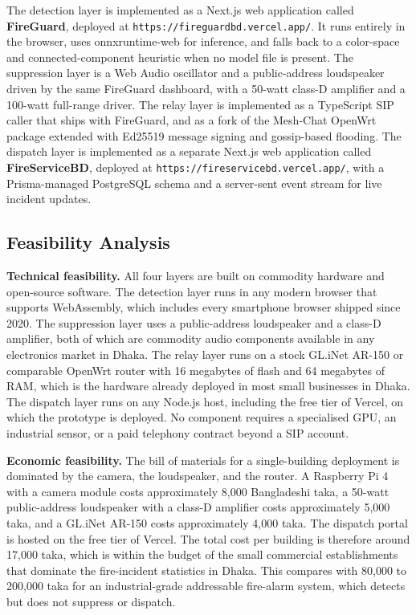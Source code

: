 The detection layer is implemented as a Next.js web application called \textbf{FireGuard}, deployed at \texttt{https://fireguardbd.vercel.app/}. It runs entirely in the browser, uses onnxruntime-web for inference, and falls back to a color-space and connected-component heuristic when no model file is present. The suppression layer is a Web Audio oscillator and a public-address loudspeaker driven by the same FireGuard dashboard, with a 50-watt class-D amplifier and a 100-watt full-range driver. The relay layer is implemented as a TypeScript SIP caller that ships with FireGuard, and as a fork of the Mesh-Chat OpenWrt package extended with Ed25519 message signing and gossip-based flooding. The dispatch layer is implemented as a separate Next.js web application called \textbf{FireServiceBD}, deployed at \texttt{https://fireservicebd.vercel.app/}, with a Prisma-managed PostgreSQL schema and a server-sent event stream for live incident updates.

\subsection{Feasibility Analysis}

\textbf{Technical feasibility.} All four layers are built on commodity hardware and open-source software. The detection layer runs in any modern browser that supports WebAssembly, which includes every smartphone browser shipped since 2020. The suppression layer uses a public-address loudspeaker and a class-D amplifier, both of which are commodity audio components available in any electronics market in Dhaka. The relay layer runs on a stock GL.iNet AR-150 or comparable OpenWrt router with 16 megabytes of flash and 64 megabytes of RAM, which is the hardware already deployed in most small businesses in Dhaka. The dispatch layer runs on any Node.js host, including the free tier of Vercel, on which the prototype is deployed. No component requires a specialised GPU, an industrial sensor, or a paid telephony contract beyond a SIP account.

\textbf{Economic feasibility.} The bill of materials for a single-building deployment is dominated by the camera, the loudspeaker, and the router. A Raspberry Pi 4 with a camera module costs approximately 8{,}000 Bangladeshi taka, a 50-watt public-address loudspeaker with a class-D amplifier costs approximately 5{,}000 taka, and a GL.iNet AR-150 costs approximately 4{,}000 taka. The dispatch portal is hosted on the free tier of Vercel. The total cost per building is therefore around 17{,}000 taka, which is within the budget of the small commercial establishments that dominate the fire-incident statistics in Dhaka. This compares with 80{,}000 to 200{,}000 taka for an industrial-grade addressable fire-alarm system, which detects but does not suppress or dispatch.

